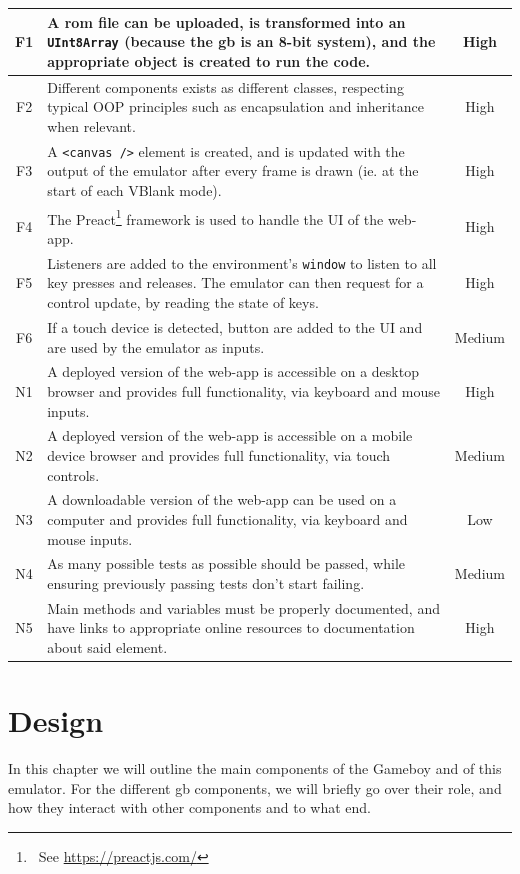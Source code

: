 \documentclass[11pt]{informatics-report}
\newcommand{\ftnt}[1]{\footnote{~See \url{#1}}}
\begin{document}
\begin{xltabular}{\textwidth}{|c|X|c|}
    F1 & A \gls{rom} file can be uploaded, is transformed into an \texttt{UInt8Array} (because the \gls{gb} is an 8-bit system), and the appropriate object is created to run the code. & High \\ \hline
    F2 & Different components exists as different classes, respecting typical OOP principles such as encapsulation and inheritance when relevant. & High \\ \hline
    F3 & A \texttt{<canvas />} element is created, and is updated with the output of the emulator after every frame is drawn (ie. at the start of each VBlank mode). & High \\ \hline
    F4 & The Preact\ftnt{https://preactjs.com/} framework is used to handle the UI of the web-app. & High \\ \hline
    F5 & Listeners are added to the environment's \texttt{window} to listen to all key presses and releases. The emulator can then request for a control update, by reading the state of keys. & High \\ \hline
    F6 & If a touch device is detected, button are added to the UI and are used by the emulator as inputs. & Medium \\ \hline

    N1 & A deployed version of the web-app is accessible on a desktop browser and provides full functionality, via keyboard and mouse inputs. & High \\ \hline
    N2 & A deployed version of the web-app is accessible on a mobile device browser and provides full functionality, via touch controls. & Medium \\ \hline
    N3 & A downloadable version of the web-app can be used on a computer and provides full functionality, via keyboard and mouse inputs. & Low \\ \hline
    N4 & As many possible tests as possible should be passed, while ensuring previously passing tests don't start failing. & Medium \\ \hline
    N5 & Main methods and variables must be properly documented, and have links to appropriate online resources to documentation about said element. & High \\ \hline
\end{xltabular}

\chapter{Design}

In this chapter we will outline the main components of the Gameboy and of this emulator. For the different \gls{gb} components, we will briefly go over their role, and how they interact with other components and to what end.
\end{document}
